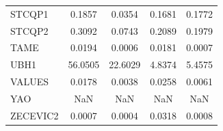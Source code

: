\begin{longtable}{lcccc}
STCQP1   &   0.1857 &   0.0354 &   0.1681 &   0.1772 \\
STCQP2   &   0.3092 &   0.0743 &   0.2089 &   0.1979 \\
TAME     &   0.0194 &   0.0006 &   0.0181 &   0.0007 \\
UBH1     &  56.0505 &  22.6029 &   4.8374 &   5.4575 \\
VALUES   &   0.0178 &   0.0038 &   0.0258 &   0.0061 \\
YAO      &      NaN &      NaN &      NaN &      NaN \\
ZECEVIC2 &   0.0007 &   0.0004 &   0.0318 &   0.0008 \\
\end{longtable}
